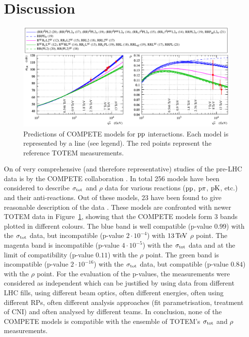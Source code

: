 \section{Discussion}
\label{sec:discussion}

\begin{figure}
\vskip-5mm
\begin{center}
\includegraphics{fig/compete_bands_si_tot_rho.pdf}
\caption{%
Predictions of COMPETE models \cite{compete-details} for $\rm pp$ interactions. Each model is represented by a line (see legend). The red points represent the reference TOTEM measurements. 
}
\label{fig:comp bands}
\end{center}
\end{figure}

On of very comprehensive (and therefore representative) studies of the pre-LHC data is by the COMPETE collaboration \cite{compete}. In total 256 models have been considered to describe $\sigma_{\rm tot}$ and $\rho$ data for various reactions ($\rm pp$, $\rm p\pi$, $\rm pK$, etc.) and their anti-reactions. Out of these models, 23 have been found to give reasonable description of the data \cite{compete-details}. These models are confronted with newer TOTEM data in Figure~\ref{fig:comp bands}, showing that the COMPETE models form 3 bands plotted in different colours. The blue band is well compatible (p-value $0.99$) with the $\sigma_{\rm tot}$ data, but incompatible (p-value $2\cdot10^{-4}$) with $13\,{\rm TeV}$ $\rho$ point. The magenta band is incompatible (p-value $4\cdot10^{-5}$) with the $\sigma_{\rm tot}$ data and at the limit of compatibility (p-value $0.11$) with the $\rho$ point. The green band is incompatible (p-value $2\cdot10^{-16}$) with the $\sigma_{\rm tot}$ data, but compatible (p-value $0.84$) with the $\rho$ point. For the evaluation of the p-values, the measurements were considered as independent which can be justified by using data from different LHC fills, using different beam optics, often different energies, often using different RPs, often different analysis approaches (fit parametrisation, treatment of CNI) and often analysed by different teams. In conclusion, none of the COMPETE models is compatible with the ensemble of TOTEM's $\sigma_{\rm tot}$ and $\rho$ measurements.

